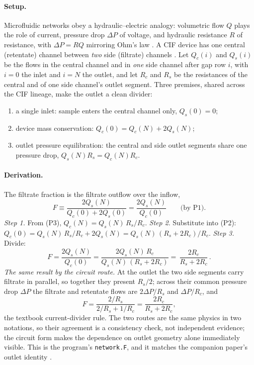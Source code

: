 \paragraph{Setup.} Microfluidic networks obey a hydraulic--electric analogy: volumetric flow
$Q$ plays the role of current, pressure drop $\Delta P$ of voltage, and hydraulic resistance
$R$ of resistance, with $\Delta P=RQ$ mirroring Ohm's law \cite[p.~515]{b13}. A CIF device
has one central (retentate) channel between \emph{two} side (filtrate) channels
\cite{b1,b4,b5}. Let $Q_c(i)$ and $Q_s(i)$ be the flows in the central
channel and in \emph{one} side channel after gap row $i$, with $i=0$ the inlet and $i=N$ the
outlet, and let $R_c$ and $R_s$ be the resistances of the central and of one side channel's
outlet segment. Three premises, shared across the CIF lineage, make the outlet a clean divider:
\begin{enumerate}
\item[(P1)] a single inlet: sample enters the central channel only, $Q_s(0)=0$;
\item[(P2)] device mass conservation: $Q_c(0)=Q_c(N)+2Q_s(N)$;
\item[(P3)] outlet pressure equilibration: the central and side outlet segments share one
pressure drop, $Q_s(N)R_s=Q_c(N)R_c$.
\end{enumerate}

\paragraph{Derivation.} The filtrate fraction is the filtrate outflow over the inflow,
\begin{equation}
F\equiv\frac{2Q_s(N)}{Q_c(0)+2Q_s(0)}=\frac{2Q_s(N)}{Q_c(0)}\qquad\text{(by P1)}.
\end{equation}
\emph{Step 1.} From (P3), $Q_c(N)=Q_s(N)\,R_s/R_c$.
\emph{Step 2.} Substitute into (P2): $Q_c(0)=Q_s(N)\,R_s/R_c+2Q_s(N)=Q_s(N)\,(R_s+2R_c)/R_c$.
\emph{Step 3.} Divide:
\begin{equation}
F=\frac{2Q_s(N)}{Q_c(0)}=\frac{2Q_s(N)\,R_c}{Q_s(N)\,(R_s+2R_c)}
=\boxed{\,\frac{2R_c}{R_s + 2R_c}\,}.
\label{eq:Fident}
\end{equation}
\emph{The same result by the circuit route.} At the outlet the two side segments carry
filtrate in parallel, so together they present $R_s/2$; across their common pressure drop
$\Delta P$ the filtrate and retentate flows are $2\Delta P/R_s$ and $\Delta P/R_c$, and
\begin{equation}
F = \frac{2/R_s}{2/R_s + 1/R_c}=\frac{2R_c}{R_s+2R_c},
\end{equation}
the textbook current-divider rule. The two routes are the same physics in two notations, so
their agreement is a consistency check, not independent evidence; the circuit form makes the
dependence on outlet geometry alone immediately visible. This is the program's
\texttt{network.F}, and it matches the companion paper's outlet identity \cite{bpre}.

